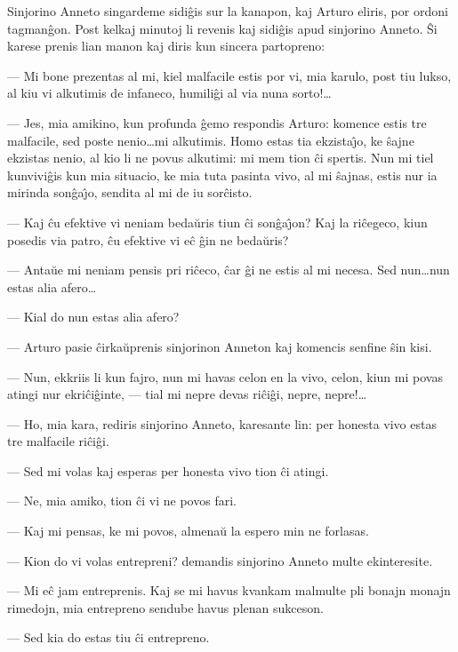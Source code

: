    Sinjorino Anneto singardeme sidi\^gis sur la kanapon, kaj Arturo
eliris, por ordoni tagman\^gon. Post kelkaj minutoj li revenis kaj
sidi\^gis apud sinjorino Anneto. \^Si karese prenis lian manon kaj
diris kun sincera partopreno:

 --- Mi bone prezentas al mi, kiel malfacile estis por vi, mia karulo,
post tiu lukso, al kiu vi alkutimis de infaneco, humili\^gi al via
nuna sorto!\dots

 --- Jes, mia amikino, kun profunda \^gemo respondis Arturo: komence
estis tre malfacile, sed poste nenio\dots mi alkutimis. Homo estas
tia ekzista\^{\j}o, ke \^sajne ekzistas nenio, al kio li ne povus
alkutimi: mi mem tion \^ci spertis. Nun mi tiel kunvivi\^gis kun mia
situacio, ke mia tuta pasinta vivo, al mi \^sajnas, estis nur ia
mirinda son\^ga\^{\j}o, sendita al mi de iu sor\^cisto.

 --- Kaj \^cu efektive vi neniam beda\u uris tiun \^ci son\^ga\^{\j}on? Kaj
la ri\^cegeco, kiun posedis via patro, \^cu efektive vi e\^c \^gin
ne beda\u uris?

 --- Anta\u ue mi neniam pensis pri ri\^ceco, \^car \^gi ne estis al mi
necesa. Sed nun\dots nun estas alia afero\dots

 --- Kial do nun estas alia afero?

 --- Arturo pasie \^cirka\u uprenis sinjorinon Anneton kaj komencis
senfine \^sin kisi.

 --- Nun, ekkriis li kun fajro, nun mi havas celon en la vivo, celon,
kiun mi povas atingi nur ekri\^ci\^ginte, --- tial mi nepre devas
ri\^ci\^gi, nepre, nepre!\dots

 --- Ho, mia kara, rediris sinjorino Anneto, karesante lin: per
honesta vivo estas tre malfacile ri\^ci\^gi.

 --- Sed mi volas kaj esperas per honesta vivo tion \^ci atingi.

 --- Ne, mia amiko, tion \^ci vi ne povos fari.

 --- Kaj mi pensas, ke mi povos, almena\u u la espero min ne forlasas.

 --- Kion do vi volas entrepreni? demandis sinjorino Anneto multe
ekinteresite.

 --- Mi e\^c jam entreprenis. Kaj se mi havus kvankam malmulte pli
bonajn monajn rimedojn, mia entrepreno sendube havus plenan
sukceson.

 --- Sed kia do estas tiu \^ci entrepreno.

